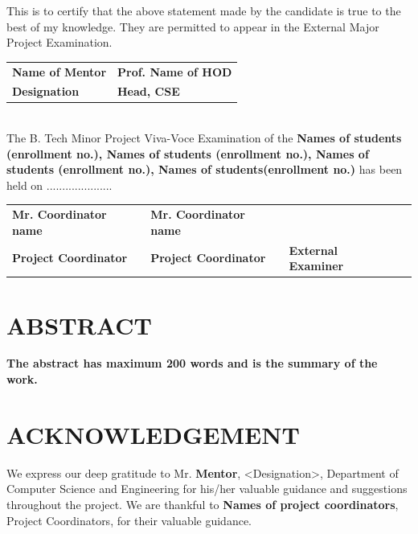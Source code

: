 \documentclass[12pt, oneside]{book}                            %
\begin{document}
    This is to certify that the above statement made by the candidate is true to the best of my knowledge. They are permitted to appear in the External Major Project Examination.\\[1.5cm]

    \noindent
    \begin{tabularx}{\textwidth}{X X}
            \textbf{\small Name of Mentor} & \textbf{\small Prof. Name of HOD} \\
            \textbf{\small Designation} & \textbf{\small Head, CSE}\\
    \end{tabularx}\\[1cm]

    The B. Tech Minor Project Viva-Voce Examination of the \textbf{Names of students (enrollment no.), Names of students (enrollment no.), Names of students (enrollment no.), Names of students(enrollment no.)} has been held on .....................\\[1.5cm]

    \noindent    
    \begin{tabularx}{\textwidth}{X X X X}
        \textbf{\small Mr. Coordinator name} &  \textbf{\small Mr. Coordinator name} &  \\
        \textbf{\small Project Coordinator} & \textbf{\small Project Coordinator} & \textbf{\small External Examiner}
    \end{tabularx}
    
\chapter*{\centering \textbf{\Large ABSTRACT}}

    \textbf{The abstract has maximum 200 words and is the summary of the work.}


\chapter*{\centering \textbf{\Large ACKNOWLEDGEMENT}}

    We express our deep gratitude to Mr. \textbf{Mentor}, <Designation>, Department of Computer Science and Engineering for his/her valuable guidance and suggestions throughout the project. We are thankful to \textbf{Names of project coordinators}, Project Coordinators, for their valuable guidance.\\[1cm]
\end{document}
